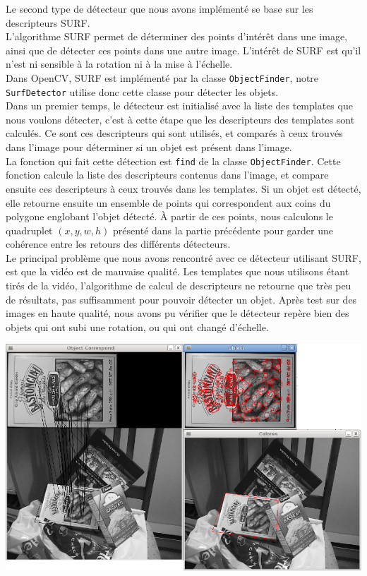 Le second type de détecteur que nous avons implémenté se base sur les descripteurs SURF.\\

L'algorithme SURF permet de déterminer des points d'intérêt dans une image, ainsi que de détecter ces points dans une autre image. L'intérêt de SURF est qu'il n'est ni sensible à la rotation ni à la mise à l'échelle.\\

Dans OpenCV, SURF est implémenté par la classe \texttt{ObjectFinder}, notre \texttt{SurfDetector} utilise donc cette classe pour détecter les objets.\\

Dans un premier temps, le détecteur est initialisé avec la liste des templates que nous voulons détecter, c'est à cette étape que les descripteurs des templates sont calculés. Ce sont ces descripteurs qui sont utilisés, et comparés à ceux trouvés dans l'image pour déterminer si un objet est présent dans l'image.\\

La fonction qui fait cette détection est \texttt{find} de la classe \texttt{ObjectFinder}. Cette fonction calcule la liste des descripteurs contenus dans l'image, et compare ensuite ces descripteurs à ceux trouvés dans les templates. Si un objet est détecté, elle retourne ensuite un ensemble de points qui correspondent aux coins du polygone englobant l'objet détecté. À partir de ces points, nous calculons le quadruplet $(x,y,w,h)$ présenté dans la partie précédente pour garder une cohérence entre les retours des différents détecteurs.\\

Le principal problème que nous avons rencontré avec ce détecteur utilisant SURF, est que la vidéo est de mauvaise qualité. Les templates que nous utilisons étant tirés de la vidéo, l'algorithme de calcul de descripteurs ne retourne que très peu de résultats, pas suffisamment pour pouvoir détecter un objet. Après test sur des images en haute qualité, nous avons pu vérifier que le détecteur repère bien des objets qui ont subi une rotation, ou qui ont changé d'échelle.\\

\begin{center}
\includegraphics[width=\textwidth]{images/findobj.png}
\end{center}

